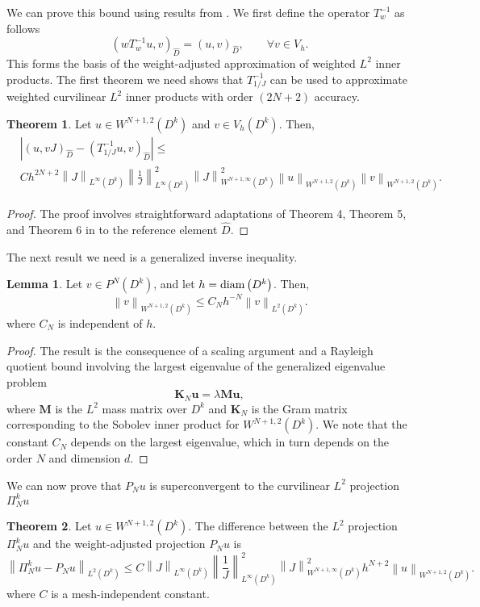 \documentclass[preprint,10pt]{article}
\theoremstyle{definition}
\theoremstyle{lemma}
\newtheorem{lemma}{Lemma}
\theoremstyle{theorem}
\newtheorem{theorem}{Theorem}
\theoremstyle{assumption}
\renewcommand{\hat}{\widehat}
\newcommand{\nor}[1]{\left\| #1 \right\|}
\newcommand{\LRp}[1]{\left( #1 \right)}
\newcommand{\LRb}[1]{\left| #1 \right|}
\begin{document}
We can prove this bound using results from \cite{chan2016weight1,chan2016weight2}.  We first define the operator $T_{w}^{-1}$ as follows
\[
\LRp{wT_{w}^{-1} u,v}_{\hat{D}} = \LRp{ u,v}_{\hat{D}}, \qquad \forall v\in V_h.
\]
This forms the basis of the weight-adjusted approximation of weighted $L^2$ inner products.  The first theorem we need shows that $T_{1/J}^{-1}$ can be used to approximate weighted curvilinear $L^2$ inner products with order $(2N+2)$ accuracy.  
\begin{theorem}
\label{thm:moment}
Let $u\in W^{N+1,2}\LRp{D^k}$ and $v\in V_h\LRp{D^k}$.  Then, 
\begin{align*}
&\LRb{\LRp{u,vJ}_{\hat{D}} - \LRp{T^{-1}_{1/J}u,v}_{\hat{D}}} \leq \\
&Ch^{2N+2}\nor{J}_{L^{\infty}\LRp{D^k}}  \nor{\frac{1}{J}}_{L^{\infty}\LRp{D^k}}^2 \nor{J}^2_{W^{N+1,\infty}\LRp{D^k}}\nor{u}_{W^{N+1,2}\LRp{D^k}}\nor{v}_{W^{N+1,2}\LRp{D^k}}.
\end{align*}
\end{theorem}
\begin{proof}
The proof involves straightforward adaptations of Theorem 4, Theorem 5, and Theorem 6 in \cite{chan2016weight1} to the reference element $\hat{D}$.  
\end{proof}
The next result we need is a generalized inverse inequality.  
\begin{lemma}
\label{lemma:sobolev}
Let $v \in P^N\LRp{D^k}$, and let $h = {\rm diam}\LRp{D^k}$.  Then,
\[
\nor{v}_{W^{N+1,2}\LRp{D^k}} \leq C_{N} h^{-N} \nor{v}_{L^2\LRp{D^k}}.
\]
where $C_{N}$ is independent of $h$.
\end{lemma}
\begin{proof}
The result is the consequence of a scaling argument and a Rayleigh quotient bound involving the largest eigenvalue of the generalized eigenvalue problem  
\[
\bm{K}_N\bm{u} = \lambda\bm{M}\bm{u},
\]
where $\bm{M}$ is the $L^2$ mass matrix over $D^k$ and $\bm{K}_N$ is the Gram matrix corresponding to the Sobolev inner product for $W^{N+1,2}\LRp{D^k}$.  We note that the constant $C_N$ depends on the largest eigenvalue, which in turn depends on the order $N$ and dimension $d$.  
\end{proof}

We can now prove that $P_Nu$ is superconvergent to the curvilinear $L^2$ projection $\Pi_N^k u$
\begin{theorem}
Let $u \in W^{N+1,2}\LRp{D^k}$.  The difference between the $L^2$ projection $\Pi^k_Nu$ and the weight-adjusted projection $P_Nu$ is
\[
\nor{\Pi_N^k u - P_N u}_{L^2\LRp{D^k}} \leq C\nor{J}_{L^{\infty}\LRp{D^k}}  \nor{\frac{1}{J}}_{L^{\infty}\LRp{D^k}}^2 \nor{J}^2_{W^{N+1,\infty}\LRp{D^k}} h^{N+2}\nor{u}_{W^{N+1,2}\LRp{D^k}}.
\]
where $C$ is a mesh-independent constant.
\end{theorem}
\end{document}
